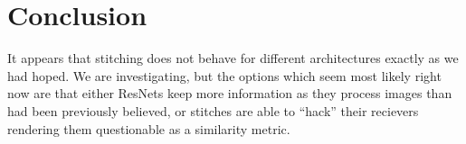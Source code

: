 \documentclass{article} %
\begin{document}
\section*{Conclusion}
It appears that stitching does not behave for different architectures exactly as we had hoped. We are investigating, but
the options which seem most likely right now are that either ResNets keep more information as they process images than
had been previously believed, or stitches are able to ``hack'' their recievers rendering them questionable as a similarity
metric.

\end{document}
